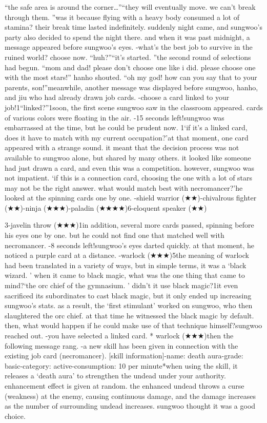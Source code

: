 “the safe area is around the corner…”“they will eventually move.
 we can’t break through them.
”was it because flying with a heavy body consumed a lot of stamina? their break time lasted indefinitely.
suddenly night came, and sungwoo’s party also decided to spend the night there.
and when it was past midnight, a message appeared before sungwoo’s eyes.
-what’s the best job to survive in the ruined world? choose now.
“huh?”“it’s started.
”the second round of selections had begun.
“mom and dad! please don’t choose one like i did.
 please choose one with the most stars!” hanho shouted.
“oh my god! how can you say that to your parents, son!”meanwhile, another message was displayed before sungwoo, hanho, and jiu who had already drawn job cards.
-choose a card linked to your job!1“linked?”1soon, the first scene sungwoo saw in the classroom appeared.
 cards of various colors were floating in the air.
-15 seconds left!sungwoo was embarrassed at the time, but he could be prudent now.
1‘if it’s a linked card, does it have to match with my current occupation?’at that moment, one card appeared with a strange sound.
it meant that the decision process was not available to sungwoo alone, but shared by many others.
it looked like someone had just drawn a card, and even this was a competition.
however, sungwoo was not impatient.
‘if this is a connection card, choosing the one with a lot of stars may not be the right answer.
 what would match best with necromancer?’he looked at the spinning cards one by one.
-shield warrior (★★)-chivalrous fighter (★★)-ninja (★★★)-paladin (★★★★)6-eloquent speaker (★★)

3-javelin throw (★★★)1in addition, several more cards passed, spinning before his eyes one by one.
 but he could not find one that matched well with necromancer.
-8 seconds left!sungwoo’s eyes darted quickly.
 at that moment, he noticed a purple card at a distance.
-warlock (★★★)5the meaning of warlock had been translated in a variety of ways, but in simple terms, it was a ‘black wizard.
’ when it came to black magic, what was the one thing that came to mind?‘the orc chief of the gymnasium.
’ didn’t it use black magic?1it even sacrificed its subordinates to cast black magic, but it only ended up increasing sungwoo’s stats.
 as a result, the ‘first stimulant’ worked on sungwoo, who then slaughtered the orc chief.
 at that time he witnessed the black magic by default.
 then, what would happen if he could make use of that technique himself?sungwoo reached out.
-you have selected a linked card.
* warlock (★★★)then the following message rang.
-a new skill has been given in connection with the existing job card (necromancer).
[skill information]-name: death aura-grade: basic-category: active-consumption: 10 per minute*when using the skill, it releases a ‘death aura’ to strengthen the undead under your authority.
enhancement effect is given at random.
 the enhanced undead throws a curse (weakness) at the enemy, causing continuous damage, and the damage increases as the number of surrounding undead increases.
sungwoo thought it was a good choice.


 
